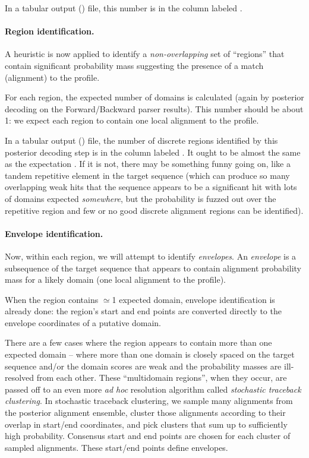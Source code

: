 In a tabular output () file, this number is in the
column labeled .

\paragraph{Region identification.}

A heuristic is now applied to identify a \emph{non-overlapping} set of
``regions'' that contain significant probability mass suggesting the
presence of a match (alignment) to the profile.

For each region, the expected number of domains is calculated (again
by posterior decoding on the Forward/Backward parser results). This
number should be about 1: we expect each region to contain one local
alignment to the profile. 

In a tabular output () file, the number of discrete
regions identified by this posterior decoding step is in the column
labeled . It ought to be almost the same as the expectation
. If it is not, there may be something funny going on, like
a tandem repetitive element in the target sequence (which can produce
so many overlapping weak hits that the sequence appears to be a
significant hit with lots of domains expected \emph{somewhere}, but
the probability is fuzzed out over the repetitive region and few or no
good discrete alignment regions can be identified).

\paragraph{Envelope identification.}

Now, within each region, we will attempt to identify \emph{envelopes}.
An \emph{envelope} is a subsequence of the target sequence that
appears to contain alignment probability mass for a likely domain (one
local alignment to the profile).

When the region contains $\simeq$1 expected domain, envelope
identification is already done: the region's start and end points are
converted directly to the envelope coordinates of a putative domain.

There are a few cases where the region appears to contain more than
one expected domain -- where more than one domain is closely spaced on
the target sequence and/or the domain scores are weak and the
probability masses are ill-resolved from each other. These
``multidomain regions'', when they occur, are passed off to an even
more \emph{ad hoc} resolution algorithm called \emph{stochastic
  traceback clustering}. In stochastic traceback clustering, we sample
many alignments from the posterior alignment ensemble, cluster those
alignments according to their overlap in start/end coordinates, and
pick clusters that sum up to sufficiently high probability. Consensus
start and end points are chosen for each cluster of sampled
alignments. These start/end points define envelopes.

